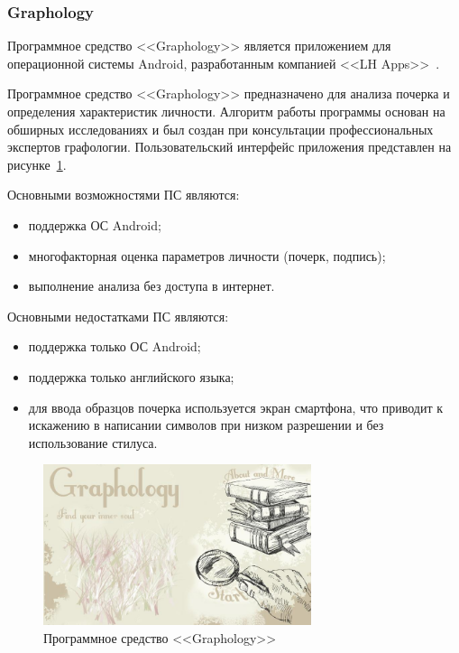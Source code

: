 \subsubsection{Graphology}
\label{sub:domain:analogs:graphology} 

Программное средство <<Graphology>> является приложением для операционной системы Android, разработанным компанией <<LH Apps>>~\cite{analogs_graphology}.

Программное средство <<Graphology>> предназначено для анализа почерка и определения характеристик личности. Алгоритм работы программы основан на обширных исследованиях и был создан при консультации профессиональных экспертов графологии. Пользовательский интерфейс приложения представлен на рисунке~\ref{fig:domain:analogs:graphology}.

Основными возможностями ПС являются:
\begin{itemize}
  \item поддержка ОС Android;
  \item многофакторная оценка параметров личности (почерк, подпись);
  \item выполнение анализа без доступа в интернет.
\end{itemize}

Основными недостатками ПС являются:
\begin{itemize}
  \item поддержка только ОС Android;
  \item поддержка только английского языка;
  \item для ввода образцов почерка используется экран смартфона, что приводит к искажению в написании символов при низком разрешении и без использование стилуса.
\end{itemize}

\begin{figure}[ht]
    \centering
    \includegraphics[width=0.7\textwidth]{figures/graphology_analog.jpeg}
    \caption{Программное средство <<Graphology>>}
    \label{fig:domain:analogs:graphology}
\end{figure}

